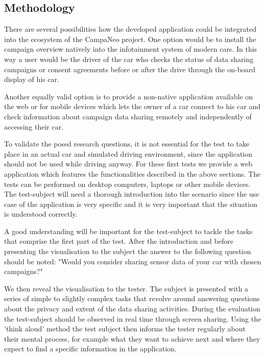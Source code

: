 
  \subsection{Methodology}
  There are several possibilities how the developed application could be integrated into the ecosystem of the CampaNeo project. One option would be to install the campaign overview natively into the infotainment system of modern cars. 
  In this way a user would be the driver of the car who checks the status of data sharing campaigns or consent agreements before or after the drive through the on-board display of his car.
  
  Another equally valid option is to provide a non-native application available on the web or for mobile devices which lets the owner of a car connect to his car and check information about campaign data sharing remotely and independently of accessing their car.
  
  To validate the posed research questions, it is not essential for the test to take place in an actual car and simulated driving environment, since the application should not be used while driving anyway. For these first tests we provide a web application which features the functionalities described in the above sections. The tests can be performed on desktop computers, laptops or other mobile devices. 
  The test-subject will need a thorough introduction into the scenario since the use case of the application is very specific and it is very important that the situation is understood correctly.
  
  A good understanding will be important for the test-subject to tackle the tasks that comprise the first part of the test.
  After the introduction and before presenting the visualisation to the subject the answer to the following question should be noted: "Would you consider sharing sensor data of your car with chosen campaigns?"
  
  We then reveal the visualisation to the tester. The subject is presented with a series of simple to slightly complex tasks that revolve around answering questions about the privacy and extent of the data sharing activities.
  During the evaluation the test-subject should be observed in real time through screen sharing. 
  Using the 'think aloud' method the test subject then informs the tester regularly about their mental process, for example what they want to achieve next and where they expect to find a specific information in the application.
  
